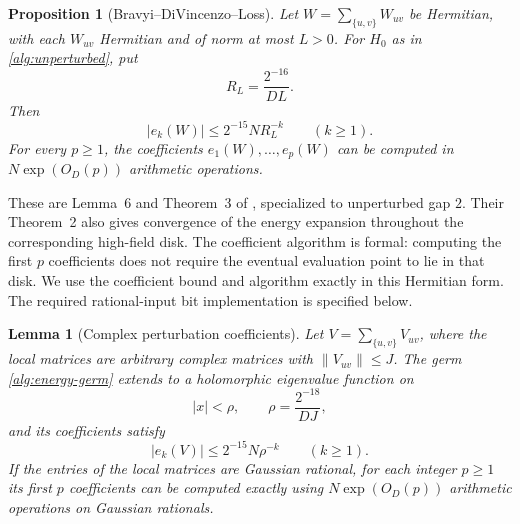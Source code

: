 \documentclass[reqno]{amsart}
\newtheorem{proposition}[theorem]{Proposition}
\newtheorem{lemma}[theorem]{Lemma}
\theoremstyle{definition}
\theoremstyle{remark}
\begin{document}
\begin{proposition}[Bravyi--DiVincenzo--Loss]
\label{alg:bdl}
Let \(W=\sum_{\{u,v\}}W_{uv}\) be Hermitian, with each
\(W_{uv}\) Hermitian and of norm at most \(L>0\).
For \(H_0\) as in \eqref{alg:unperturbed}, put
\[
 R_L=\frac{2^{-16}}{DL}.
 \]
Then
\begin{equation}
 |e_k(W)|\le2^{-15}N R_L^{-k}\qquad(k\ge1).
 \label{alg:bdl-bound}
\end{equation}
For every \(p\ge1\), the coefficients
\(e_1(W),\ldots,e_p(W)\) can be computed in
\(N\exp(O_D(p))\) arithmetic operations.
\end{proposition}

These are Lemma~6 and Theorem~3 of \cite{BDL08}, specialized to
unperturbed gap \(2\).  Their Theorem~2 also gives convergence of the
energy expansion throughout the corresponding high-field disk.
The coefficient algorithm is formal: computing the first \(p\)
coefficients does not require the eventual evaluation point to lie in
that disk.  We use the coefficient bound and algorithm exactly in this
Hermitian form.  The required rational-input bit implementation is
specified below.

\begin{lemma}[Complex perturbation coefficients]
\label{alg:complexification}
Let \(V=\sum_{\{u,v\}}V_{uv}\), where the local matrices are arbitrary
complex matrices with \(\|V_{uv}\|\le J\).
The germ \eqref{alg:energy-germ} extends to a holomorphic eigenvalue
function on
\[
 |x|<\rho,\qquad \rho=\frac{2^{-18}}{DJ},
 \]
and its coefficients satisfy
\begin{equation}
 |e_k(V)|\le2^{-15}N\rho^{-k}\qquad(k\ge1).
 \label{alg:complex-bound}
\end{equation}
If the entries of the local matrices are Gaussian rational, for each
integer \(p\ge1\) its first \(p\) coefficients can be computed exactly using
\(N\exp(O_D(p))\) arithmetic operations on Gaussian rationals.
\end{lemma}
\end{document}

